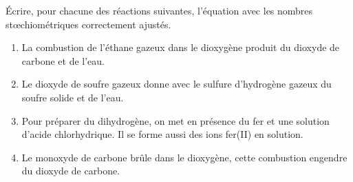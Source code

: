 Écrire, pour chacune des réactions suivantes, l'équation avec les nombres
stœchiométriques correctement ajustés.
\begin{enumerate}
    \item La combustion de l'éthane  gazeux dans le dioxygène produit
          du dioxyde de carbone et de l'eau.
    \item Le dioxyde de soufre gazeux donne avec le sulfure d'hydrogène gazeux
          du soufre solide et de l'eau.
    \item Pour préparer du dihydrogène, on met en présence du fer et une
          solution d'acide chlorhydrique. Il se forme aussi des ions fer(II) en
          solution.
    \item Le monoxyde de carbone brûle dans le dioxygène, cette combustion
          engendre du dioxyde de carbone.
\end{enumerate}

